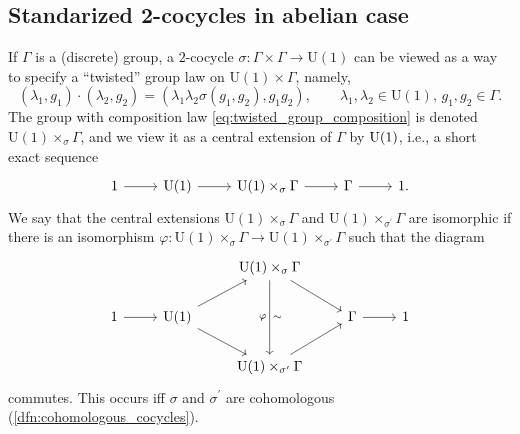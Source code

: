 \documentclass{amsart}
\numberwithin{figure}{section}
\numberwithin{equation}{section}
\numberwithin{table}{section}
\theoremstyle{plain}
\theoremstyle{definition}
\theoremstyle{remark}
\theoremstyle{nonumber}
\begin{document}
\subsection{Standarized 2-cocycles in abelian case}
If $\Gamma$ is a (discrete) group, a $2$-cocycle $\sigma\colon \Gamma\times\Gamma\to\mathrm{U}(1)$ can be viewed as a way to specify a ``twisted'' group law on $\mathrm{U}(1)\times \Gamma$, namely,
\begin{equation}\label{eq:twisted_group_composition}
(\lambda_1,g_1)\cdot(\lambda_2,g_2)=(\lambda_1\lambda_2 \sigma(g_1,g_2), g_1g_2),\qquad \lambda_1,\lambda_2\in \mathrm{U}(1),\, g_1, g_2\in \Gamma.
\end{equation}
The group with composition law \eqref{eq:twisted_group_composition} is denoted $\mathrm{U}(1)\times_\sigma \Gamma$, and we view it as a central extension of $\Gamma$ by ${\rm U}(1)$, i.e., a short exact sequence
\begin{equation}\label{eq:central_extension_sequence}
\begin{tikzcd}
1\ar[r] &\mathrm{U}(1)\ar[r] &\mathrm{U}(1)\times_\sigma \Gamma \ar[r] &\Gamma \ar[r] & 1.
\end{tikzcd}
\end{equation}
We say that the central extensions $\mathrm{U}(1)\times_\sigma \Gamma$ and
$\mathrm{U}(1)\times_{\sigma^\prime} \Gamma$ are isomorphic if there is an
isomorphism $\varphi\colon \mathrm{U}(1)\times_\sigma \Gamma\to \mathrm{U}(1)\times_{\sigma^\prime} \Gamma$ such that the diagram
\begin{equation}\label{eq:CE_cohom_cocycles}
\begin{tikzcd}
& & \mathrm{U}(1)\times_\sigma\Gamma\ar[dr]\ar[dd,"\sim","\varphi"'] & & \\
1\ar[r] & \mathrm{U}(1)\ar[ur]\ar[dr] & &\Gamma\ar[r] & 1 \\
& & \mathrm{U}(1)\times_{\sigma^\prime} \Gamma\ar[ru] & &
\end{tikzcd}
\end{equation}
commutes. This occurs iff $\sigma$ and $\sigma^\prime$ are cohomologous (\cref{dfn:cohomologous_cocycles}).
\end{document}
